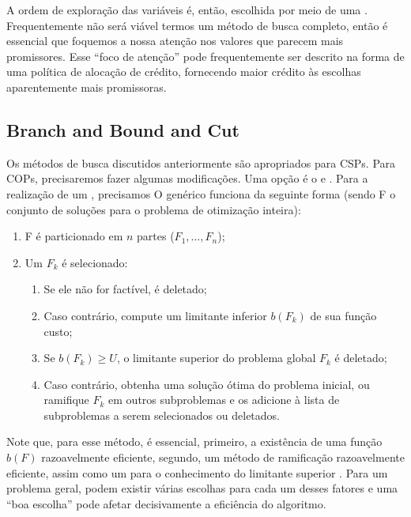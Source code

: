 \documentclass{article}
\begin{document}
A ordem de exploração das variáveis é, então, escolhida por meio de uma . Frequentemente não será viável termos um método de busca completo, então é
essencial que foquemos a nossa atenção nos valores que parecem mais promissores. Esse ``foco de
atenção'' pode frequentemente ser descrito na forma de uma política de alocação de crédito,
fornecendo maior crédito às escolhas aparentemente mais promissoras.

\subsection{Branch and Bound and Cut}

Os métodos de busca discutidos anteriormente são apropriados para CSPs. Para COPs, precisaremos
fazer algumas modificações. Uma opção é o  e . Para a realização de um , precisamos %
O  genérico funciona da seguinte forma (sendo F o conjunto de
soluções para o problema de otimização inteira):

\begin{enumerate}
  \item F é particionado em $n$ partes ($F_1, \hdots, F_n$);
  \item Um $F_k$ é selecionado:
    \begin{enumerate}
      \item Se ele não for factível, é deletado;
      \item Caso contrário, compute um limitante inferior $b(F_k)$ de sua função custo;
      \item Se $b(F_k) \geq U$, o limitante superior do problema global $F_k$ é deletado;
      \item Caso contrário, obtenha uma solução ótima do problema inicial, ou ramifique $F_k$ em
        outros subproblemas e os adicione à lista de subproblemas a serem selecionados ou deletados.
    \end{enumerate}
  \end{enumerate}

Note que, para esse método, é essencial, primeiro, a existência de uma função $b(F)$ razoavelmente
eficiente, segundo, um método de ramificação razoavelmente eficiente, assim como um para o
conhecimento do limitante superior . Para um problema geral, podem existir várias
escolhas para cada um desses fatores e uma ``boa escolha'' pode afetar decisivamente a eficiência
do algoritmo.
\end{document}
